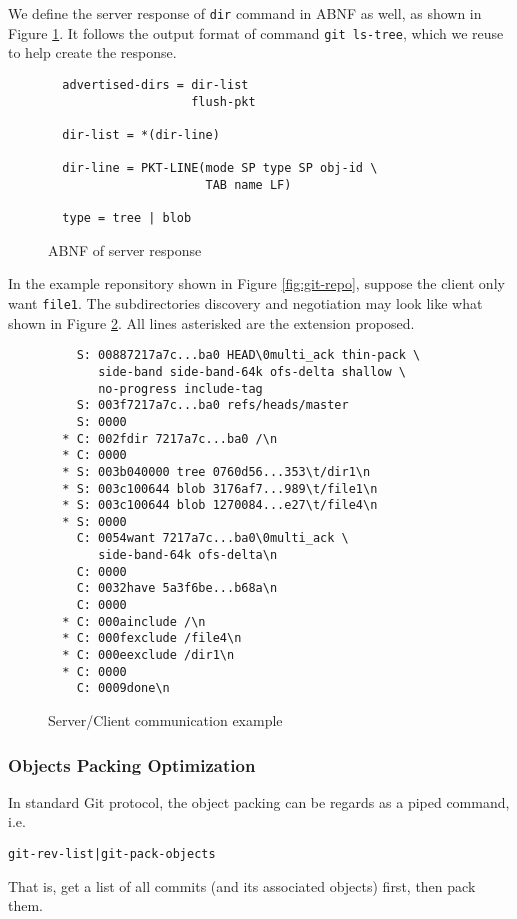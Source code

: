 \documentclass[preprint]{sigplanconf}
\begin{document}
We define the server response of \verb|dir| command in ABNF as well, as shown
in Figure \ref{fig:server-response-ABNF}.
It follows the output format of command \verb|git ls-tree|, which we reuse to
help create the response.
\begin{figure}[htpb]
  \centering
  \begin{verbatim}
  advertised-dirs = dir-list
                    flush-pkt

  dir-list = *(dir-line)

  dir-line = PKT-LINE(mode SP type SP obj-id \
                      TAB name LF)

  type = tree | blob
  \end{verbatim}
  \caption{ABNF of server response}
  \label{fig:server-response-ABNF}
\end{figure}

In the example reponsitory shown in Figure \ref{fig:git-repo}, suppose the
client only want \verb|file1|.
The subdirectories discovery and negotiation may look like what shown in Figure
\ref{fig:c/s-comm}.
All lines asterisked are the extension proposed.

\begin{figure}[htpb]
  \centering
  \begin{verbatim}
    S: 00887217a7c...ba0 HEAD\0multi_ack thin-pack \
       side-band side-band-64k ofs-delta shallow \
       no-progress include-tag
    S: 003f7217a7c...ba0 refs/heads/master
    S: 0000
  * C: 002fdir 7217a7c...ba0 /\n
  * C: 0000
  * S: 003b040000 tree 0760d56...353\t/dir1\n
  * S: 003c100644 blob 3176af7...989\t/file1\n
  * S: 003c100644 blob 1270084...e27\t/file4\n
  * S: 0000
    C: 0054want 7217a7c...ba0\0multi_ack \
       side-band-64k ofs-delta\n
    C: 0000
    C: 0032have 5a3f6be...b68a\n
    C: 0000
  * C: 000ainclude /\n
  * C: 000fexclude /file4\n
  * C: 000eexclude /dir1\n
  * C: 0000
    C: 0009done\n
  \end{verbatim}
  \caption{Server/Client communication example}
  \label{fig:c/s-comm}
\end{figure}

\subsubsection{Objects Packing Optimization}
In standard Git protocol, the object packing can be regards as a piped command,
i.e.
\begin{verbatim}
git-rev-list|git-pack-objects
\end{verbatim}
That is, get a list of all commits (and its associated objects) first, then
pack them.
\end{document}

